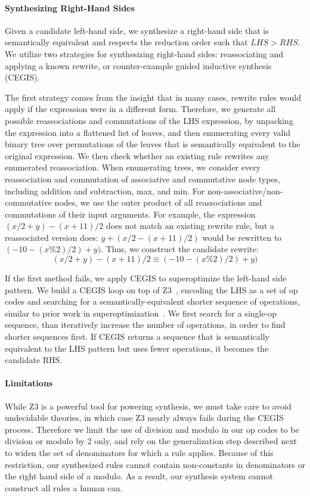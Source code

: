 \documentclass[sigplan,10pt,review,anonymous]{acmart}\settopmatter{printfolios=true,printccs=false,printacmref=false}
\begin{document}
\paragraph{Synthesizing Right-Hand Sides} Given a candidate left-hand side, we 
synthesize a right-hand side that is semantically equivalent and respects the reduction
order such that $\mathit{LHS} > \mathit{RHS}$.  We utilize two strategies for synthesizing
right-hand sides: reassociating and applying a known rewrite, or counter-example guided
inductive synthesis (CEGIS).

The first strategy comes from the insight that in many cases, rewrite rules would apply
if the expression were in a different form.  Therefore, we generate all possible
reassociations and commutations of the LHS expression, by unpacking the expression
into a flattened list of leaves, and then enumerating every valid binary
tree over permutations of the leaves that is semantically equivalent to the original
expression.  We then check whether an existing rule rewrites any enumerated reassociation.
When enumerating trees, we consider every reassociation and commutation
of associative and commutative node types, including addition and subtraction, max, and
min.  For non-associative/non-commutative nodes, we use the outer product of all reassociations
and commutations of their input arguments.  For example, the expression $(x/2 + y) - (x + 11)/2$
does not match an existing rewrite rule, but a reassociated version does: $y + (x/2 - (x + 11)/2)$
would be rewritten to $(-10 - (x \% 2)/2) + y)$.  Thus, we construct the candidate rewrite:
$$(x/2 + y) - (x + 11)/2 \equiv (-10 - (x \% 2)/2) + y)$$

If the first method fails, we apply CEGIS to superoptimize the left-hand side pattern.
We build a CEGIS loop on top of Z3~\cite{de2008z3}, encoding the LHS as a set of op codes
and searching for a semantically-equivalent shorter sequence of operations, similar
to prior work in superoptimization~\cite{regehr2018superoptimization, mangpo2016superoptimization}.
We first search for a single-op sequence,
than iteratively increase the number of operations, in order to find shorter sequences
first.  If CEGIS returns a sequence that is semantically equivalent to the LHS pattern but uses fewer
operations, it becomes the candidate RHS.

\paragraph{Limitations} While Z3 is a powerful tool for powering synthesis, we must take care to avoid
undecidable theories, in which case Z3 nearly always fails during the CEGIS process.
Therefore we limit the use of division and modulo in our op codes to be division
or modulo by 2 only, and rely on the generalization step described next to
widen the set of denominators for which a rule applies.  Because of this
restriction, our synthesized rules cannot contain non-constants in denominators
or the right hand side of a modulo.  As a result, our synthesis system cannot
construct all rules a human can.
\end{document}
